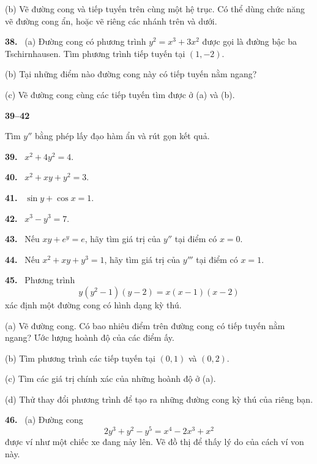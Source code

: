 \documentclass[12pt,a4paper]{article}
\newcommand{\bt}[1]{\par\smallskip\noindent\textbf{#1.}\ }
\newcommand{\group}[1]{\par\medskip\noindent\textbf{#1}\par\nopagebreak[4]}
\begin{document}
(b) Vẽ đường cong và tiếp tuyến trên cùng một hệ trục. Có thể dùng chức năng vẽ đường cong ẩn, hoặc vẽ riêng các nhánh trên và dưới.
\bt{38} (a) Đường cong có phương trình $y^2=x^3+3x^2$ được gọi là đường bậc ba Tschirnhausen. Tìm phương trình tiếp tuyến tại $(1,-2)$.

(b) Tại những điểm nào đường cong này có tiếp tuyến nằm ngang?

(c) Vẽ đường cong cùng các tiếp tuyến tìm được ở (a) và (b).
\group{39–42} Tìm $y''$ bằng phép lấy đạo hàm ẩn và rút gọn kết quả.
\bt{39} $x^2+4y^2=4$.
\bt{40} $x^2+xy+y^2=3$.
\bt{41} $\sin y+\cos x=1$.
\bt{42} $x^3-y^3=7$.
\bt{43} Nếu $xy+e^y=e$, hãy tìm giá trị của $y''$ tại điểm có $x=0$.
\bt{44} Nếu $x^2+xy+y^3=1$, hãy tìm giá trị của $y'''$ tại điểm có $x=1$.
\bt{45} Phương trình
\[y(y^2-1)(y-2)=x(x-1)(x-2)\]
xác định một đường cong có hình dạng kỳ thú.

(a) Vẽ đường cong. Có bao nhiêu điểm trên đường cong có tiếp tuyến nằm ngang? Ước lượng hoành độ của các điểm ấy.

(b) Tìm phương trình các tiếp tuyến tại $(0,1)$ và $(0,2)$.

(c) Tìm các giá trị chính xác của những hoành độ ở (a).

(d) Thử thay đổi phương trình để tạo ra những đường cong kỳ thú của riêng bạn.
\bt{46} (a) Đường cong
\[2y^3+y^2-y^5=x^4-2x^3+x^2\]
được ví như một chiếc xe đang nảy lên. Vẽ đồ thị để thấy lý do của cách ví von này.
\end{document}
